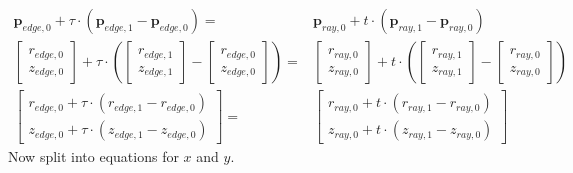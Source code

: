 \documentclass{article}
\begin{document}
\begin{align*}
  \bm{p}_{edge, 0} + \tau\cdot(\bm{p}_{edge, 1} - \bm{p}_{edge, 0}) = & \bm{p}_{ray, 0} + t\cdot(\bm{p}_{ray, 1} - \bm{p}_{ray, 0})\\
  \begin{bmatrix} r_{edge, 0} \\ z_{edge, 0} \end{bmatrix} + \tau\cdot\left(\begin{bmatrix} r_{edge, 1} \\ z_{edge, 1} \end{bmatrix}  -  \begin{bmatrix} r_{edge, 0} \\ z_{edge, 0} \end{bmatrix} \right) = & \begin{bmatrix} r_{ray, 0} \\ z_{ray, 0} \end{bmatrix} + t\cdot\left(\begin{bmatrix} r_{ray, 1} \\ z_{ray, 1} \end{bmatrix}  -  \begin{bmatrix} r_{ray, 0} \\ z_{ray, 0} \end{bmatrix} \right)\\
  \begin{bmatrix} r_{edge, 0} + \tau\cdot(r_{edge, 1} - r_{edge, 0}) \\ z_{edge, 0} + \tau\cdot(z_{edge, 1} - z_{edge, 0}) \end{bmatrix} = & \begin{bmatrix} r_{ray, 0} + t\cdot(r_{ray, 1} - r_{ray, 0}) \\ z_{ray, 0} + t\cdot(z_{ray, 1} - z_{ray, 0}) \end{bmatrix}
\end{align*}
Now split into equations for $x$ and $y$.
\end{document}

